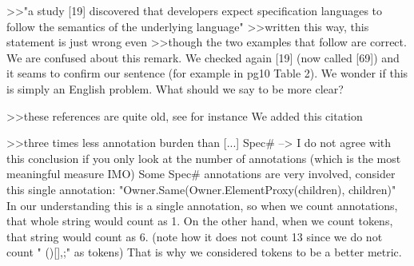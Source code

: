 >>"a study [19] discovered that developers expect specification languages to follow the semantics of the underlying language"
>>written this way, this statement is just wrong even
>>though the two examples that follow are correct.
We are confused about this remark. We checked again [19] (now called [69]) and it seams to confirm our sentence (for example in pg10 Table 2).
We wonder if this is simply an English problem. What should we say to be more clear?

>>these references are quite old, see for instance
We added this citation

>>three times less annotation burden than [...] Spec# --> I do not agree with this conclusion if you only look at the number of annotations (which is the most meaningful measure IMO)
Some Spec# annotations are very involved, consider this single annotation:
"Owner.Same(Owner.ElementProxy(children), children)" In our understanding this is a single annotation, so when we count annotations, that whole string would count as 1.
On the other hand, when we count tokens, that string would count as 6.
(note how it does not count 13 since we do not count " ()[]{},;" as tokens)
That is why we considered tokens to be a better metric.

